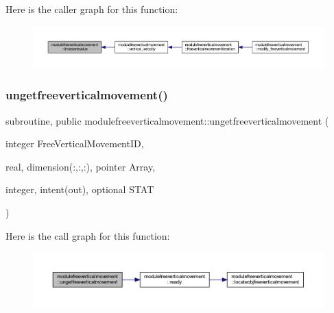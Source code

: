 Here is the caller graph for this function\+:\nopagebreak
\begin{figure}[H]
\begin{center}
\leavevmode
\includegraphics[width=350pt]{namespacemodulefreeverticalmovement_a543eec774fcc212b6cb45cb2eb05b988_icgraph}
\end{center}
\end{figure}
\mbox{\label{namespacemodulefreeverticalmovement_a0dee0aecf95b688c425cff9d35e998aa}} 
\subsubsection{\texorpdfstring{ungetfreeverticalmovement()}{ungetfreeverticalmovement()}}
{\footnotesize\ttfamily subroutine, public modulefreeverticalmovement\+::ungetfreeverticalmovement (\begin{DoxyParamCaption}\item[{integer}]{Free\+Vertical\+Movement\+ID,  }\item[{real, dimension(\+:,\+:,\+:), pointer}]{Array,  }\item[{integer, intent(out), optional}]{S\+T\+AT }\end{DoxyParamCaption})}

Here is the call graph for this function\+:\nopagebreak
\begin{figure}[H]
\begin{center}
\leavevmode
\includegraphics[width=350pt]{namespacemodulefreeverticalmovement_a0dee0aecf95b688c425cff9d35e998aa_cgraph}
\end{center}
\end{figure}
\mbox{\label{namespacemodulefreeverticalmovement_ab6e298fcea3ea467957f90a97c8032df}} 
